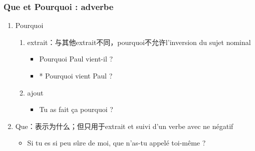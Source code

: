 \documentclass[UTF8]{report}
\begin{document}
\subsubsection{Que et Pourquoi : adverbe}

\begin{enumerate}
    \item Pourquoi
    \begin{enumerate}
        \item extrait：与其他extrait不同，pourquoi不允许l’inversion du sujet nominal
        \begin{itemize}
            \item Pourquoi Paul vient-il ?
            \item * Pourquoi vient Paul ?
        \end{itemize}
        \item ajout
        \begin{itemize}
            \item Tu as fait ça pourquoi ?
        \end{itemize}
    \end{enumerate}
    \item Que：表示为什么；但只用于extrait et suivi d’un verbe avec ne négatif
    \begin{itemize}
        \item Si tu es si peu sûre de moi, que n’as-tu appelé toi-même ? 
    \end{itemize}
\end{enumerate}
\end{document}
